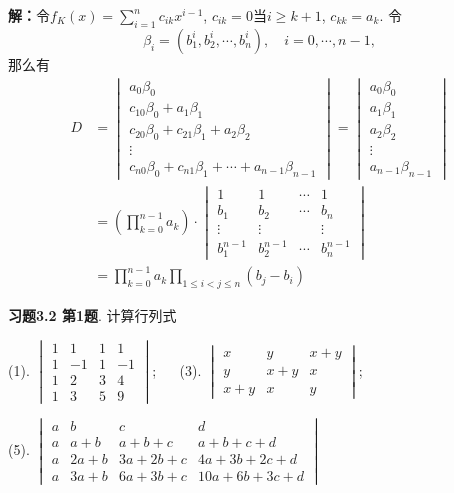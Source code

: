 {\bf 解：}令$f_K(x) = \sum\limits_{i=1}^n c_{ik} x^{i-1}$, $c_{ik} = 0$当$i \geqslant k+1$, $c_{kk} = a_k$. 令
$$\beta_i = (b_1^{i}, b_2^{i}, \cdots, b_n^{i}), \quad i = 0,\cdots,n-1,$$
那么有
\begin{align*}
D & = \begin{vmatrix}
a_0\beta_0 \\ c_{10}\beta_0 + a_1\beta_1 \\ c_{20}\beta_0 + c_{21}\beta_1 + a_2\beta_2 \\ \vdots \\ c_{n0}\beta_0 + c_{n1}\beta_1 + \cdots + a_{n-1}\beta_{n-1}
\end{vmatrix}
= \begin{vmatrix}
a_0\beta_0 \\ a_1\beta_1 \\ a_2\beta_2 \\ \vdots \\ a_{n-1}\beta_{n-1}
\end{vmatrix} \\
& = \left( \prod_{k=0}^{n-1} a_k \right) \cdot \begin{vmatrix} 1 & 1 & \cdots & 1 \\ b_1 & b_2 & \cdots & b_n \\ \vdots & \vdots & & \vdots \\ b_1^{n-1} & b_2^{n-1} & \cdots & b_n^{n-1} \end{vmatrix} \\
& = \prod_{k=0}^{n-1} a_k \prod_{1\leqslant i < j \leqslant n} (b_j-b_i)
\end{align*}

\newpageorvspace

{\bf 习题3.2 第1题}. 计算行列式

(1). $\begin{vmatrix} 1 & 1 & 1 & 1 \\ 1 & -1 & 1 & -1 \\ 1 & 2 & 3 & 4 \\ 1 & 3 & 5 & 9 \end{vmatrix}$; $\quad$ (3). $\begin{vmatrix} x & y & x+y \\ y & x+y & x \\ x+y & x & y \end{vmatrix}$;

(5). $\begin{vmatrix} a & b & c & d \\ a & a+b & a+b+c & a+b+c+d \\ a & 2a+b & 3a+2b+c & 4a+3b+2c+d \\ a & 3a+b & 6a+3b+c & 10a+6b+3c+d \end{vmatrix}$


